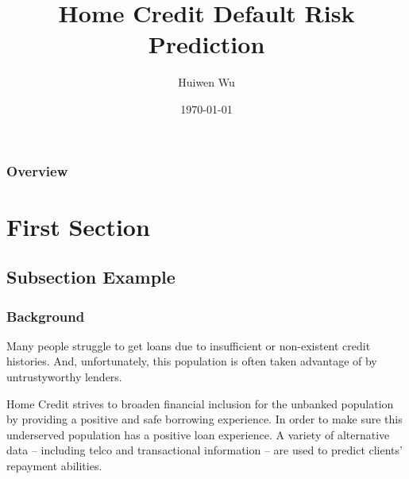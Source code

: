 \documentclass{beamer}
\title[Short title]{Home Credit Default Risk Prediction} %
\author{Huiwen Wu} %
\institute[UCI] %
{
University of California, Irvine \\ %
\medskip
\textit{huiwenw@uci.edu} %
}
\date{\today} %
\begin{document}
\begin{frame}
\titlepage %
\end{frame}

\begin{frame}
\frametitle{Overview} %
\tableofcontents %
\end{frame}


\section{First Section} %

\subsection{Subsection Example} %

\begin{frame}
\frametitle{Background}
Many people struggle to get loans due to insufficient or non-existent credit histories. And, unfortunately, this population is often taken advantage of by untrustyworthy lenders. 

Home Credit strives to broaden financial inclusion for the unbanked population by providing a positive and safe borrowing experience. In order to make sure this underserved population has a positive loan experience. A variety of alternative data -- including telco and transactional information -- are used to predict clients' repayment abilities. 
\end{frame}
\end{document}
